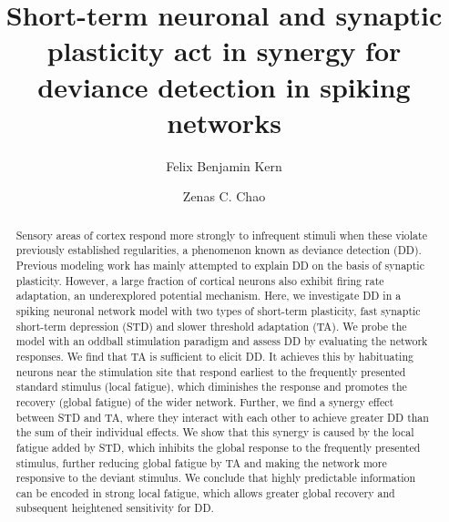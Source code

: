 \documentclass[9pt,lineno,onehalfspacing]{elife}
\title{Short-term neuronal and synaptic plasticity act in synergy for deviance detection in spiking networks}
\author[1]{Felix Benjamin Kern}
\author[1*]{Zenas C. Chao}
\affil[1]{International Research Center for Neurointelligence (WPI-IRCN), The University of Tokyo}
\begin{document}
\maketitle

\begin{abstract}
Sensory areas of cortex respond more strongly to infrequent stimuli when these violate previously established regularities, a phenomenon known as deviance detection (DD). Previous modeling work has mainly attempted to explain DD on the basis of synaptic plasticity. However, a large fraction of cortical neurons also exhibit firing rate adaptation, an underexplored potential mechanism. Here, we investigate DD in a spiking neuronal network model with two types of short-term plasticity, fast synaptic short-term depression (STD) and slower threshold adaptation (TA). We probe the model with an oddball stimulation paradigm and assess DD by evaluating the network responses. We find that TA is sufficient to elicit DD. It achieves this by habituating neurons near the stimulation site that respond earliest to the frequently presented standard stimulus (local fatigue), which diminishes the response and promotes the recovery (global fatigue) of the wider network. Further, we find a synergy effect between STD and TA, where they interact with each other to achieve greater DD than the sum of their individual effects. We show that this synergy is caused by the local fatigue added by STD, which inhibits the global response to the frequently presented stimulus, further reducing global fatigue by TA and making the network more responsive to the deviant stimulus. We conclude that highly predictable information can be encoded in strong local fatigue, which allows greater global recovery and subsequent heightened sensitivity for DD.
\end{abstract}
\end{document}

